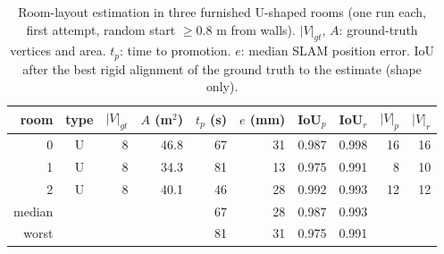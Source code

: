 \begin{table}[t]
\centering
\caption{Room-layout estimation in three furnished U-shaped rooms (one run each, first attempt, random start $\geq$0.8 m from walls). $|V|_{gt}$, $A$: ground-truth vertices and area. $t_p$: time to promotion. $e$: median SLAM position error. IoU after the best rigid alignment of the ground truth to the estimate (shape only).}
\label{tab:estimation-synthetic-U}
\begin{tabular}{r c r r r r r r r r}
\toprule
room & type & $|V|_{gt}$ & $A$ (m$^2$) & $t_p$ (s) & $e$ (mm) & IoU$_p$ & IoU$_r$ & $|V|_p$ & $|V|_r$ \\
\midrule
0 & U & 8 & 46.8 & 67 & 31 & 0.987 & 0.998 & 16 & 16 \\
1 & U & 8 & 34.3 & 81 & 13 & 0.975 & 0.991 & 8 & 10 \\
2 & U & 8 & 40.1 & 46 & 28 & 0.992 & 0.993 & 12 & 12 \\
\midrule
median & & & & 67 & 28 & 0.987 & 0.993 & & \\
worst & & & & 81 & 31 & 0.975 & 0.991 & & \\
\bottomrule
\end{tabular}
\end{table}
